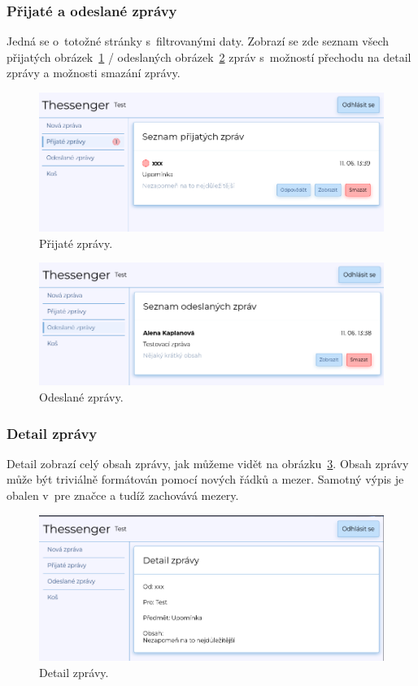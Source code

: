 \documentclass[
  master,
  program=ainf,
  tables=false,
  sourcecodes,
  glossaries,
  index
]{kidiplom}
\begin{document}
\subsubsection{Přijaté a odeslané zprávy}
Jedná se o~totožné stránky s~filtrovanými daty. Zobrazí se zde seznam všech
přijatých obrázek~\ref{fig:inobx} / odeslaných obrázek~\ref{fig:outbox} zpráv s~možností přechodu na detail 
zprávy a možnosti smazání zprávy.

\begin{figure}[H]
  \centering
  \includegraphics[width=\textwidth]{graphics/thessenger_inbox.png}
  \caption{Přijaté zprávy.}
  \label{fig:inobx}
\end{figure}

\begin{figure}[H]
  \centering
  \includegraphics[width=\textwidth]{graphics/thessenger_outbox.png}
  \caption{Odeslané zprávy.}
  \label{fig:outbox}
\end{figure}

\subsubsection{Detail zprávy}
Detail zobrazí celý obsah zprávy, jak můžeme vidět na obrázku~\ref{fig:message_detail}. Obsah
zprávy může být triviálně formátován pomocí nových řádků a mezer. Samotný výpis je obalen v~pre
značce a tudíž zachovává mezery.

\begin{figure}[H]
  \centering
  \includegraphics[width=\textwidth]{graphics/thessenger_message_detail.png}
  \caption{Detail zprávy.}
  \label{fig:message_detail}
\end{figure}
\end{document}
